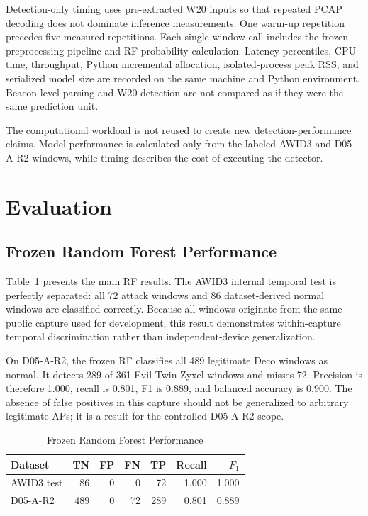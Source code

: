 \documentclass[conference]{IEEEtran}
\begin{document}
Detection-only timing uses pre-extracted W20 inputs so that repeated PCAP decoding does not dominate inference measurements. One warm-up repetition precedes five measured repetitions. Each single-window call includes the frozen preprocessing pipeline and RF probability calculation. Latency percentiles, CPU time, throughput, Python incremental allocation, isolated-process peak RSS, and serialized model size are recorded on the same machine and Python environment. Beacon-level parsing and W20 detection are not compared as if they were the same prediction unit.

The computational workload is not reused to create new detection-performance claims. Model performance is calculated only from the labeled AWID3 and D05-A-R2 windows, while timing describes the cost of executing the detector.

\section{Evaluation}
\label{sec:results}

\subsection{Frozen Random Forest Performance}

Table~\ref{tab:rfresults} presents the main RF results. The AWID3 internal temporal test is perfectly separated: all 72 attack windows and 86 dataset-derived normal windows are classified correctly. Because all windows originate from the same public capture used for development, this result demonstrates within-capture temporal discrimination rather than independent-device generalization.

On D05-A-R2, the frozen RF classifies all 489 legitimate Deco windows as normal. It detects 289 of 361 Evil Twin Zyxel windows and misses 72. Precision is therefore 1.000, recall is 0.801, F1 is 0.889, and balanced accuracy is 0.900. The absence of false positives in this capture should not be generalized to arbitrary legitimate APs; it is a result for the controlled D05-A-R2 scope.

\begin{table}[t]
\caption{Frozen Random Forest Performance}
\label{tab:rfresults}
\centering
\footnotesize
\begin{tabular}{@{}lrrrrrr@{}}
\toprule
\textbf{Dataset} & \textbf{TN} & \textbf{FP} & \textbf{FN} & \textbf{TP} & \textbf{Recall} & \textbf{$F_1$}\\
\midrule
AWID3 test & 86 & 0 & 0 & 72 & 1.000 & 1.000\\
D05-A-R2 & 489 & 0 & 72 & 289 & 0.801 & 0.889\\
\bottomrule
\end{tabular}
\end{table}
\end{document}

